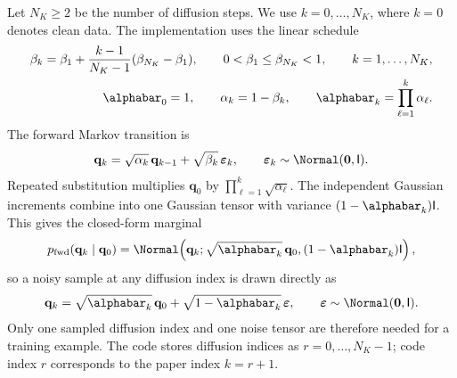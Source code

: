 Let $N_K\geq2$ be the number of diffusion steps. We use $k=0,\ldots,N_K$, where
$k=0$ denotes clean data. The implementation uses the linear schedule
\begin{equation}
  \begin{aligned}
    \beta_k
    =
    \beta_1+\frac{k-1}{N_K-1}(\beta_{N_K}-\beta_1),
    \qquad 0<\beta_1\leq\beta_{N_K}<1,
    \qquad k=1,\ldots,N_K,
    \\
    \alphabar_0=1,
    \qquad
    \alpha_k=1-\beta_k,
    \qquad
    \alphabar_k=\prod_{\ell=1}^{k}\alpha_\ell .
  \end{aligned}
    \label{eq:alpha_schedule}
\end{equation}
The forward Markov transition is
\begin{equation}
    \mathbf{q}_k
    =
    \sqrt{\alpha_k}\,\mathbf{q}_{k-1}
    +
    \sqrt{\beta_k}\,\boldsymbol{\varepsilon}_k,
    \qquad
    \boldsymbol{\varepsilon}_k\sim\Normal(\mathbf{0},\mathsf{I}).
    \label{eq:forward_step}
\end{equation}
Repeated substitution multiplies $\mathbf{q}_0$ by
$\prod_{\ell=1}^{k}\sqrt{\alpha_\ell}$. The independent Gaussian increments
combine into one Gaussian tensor with variance $(1-\alphabar_k)\mathsf{I}$.
This gives the closed-form marginal
\begin{equation}
    p_{\mathrm{fwd}}(\mathbf{q}_k\mid\mathbf{q}_0)
    =
    \Normal\!\left(
        \mathbf{q}_k;
        \sqrt{\alphabar_k}\,\mathbf{q}_0,
        (1-\alphabar_k)\mathsf{I}
    \right),
    \label{eq:forward_marginal_density}
\end{equation}
so a noisy sample at any diffusion index is drawn directly as
\begin{equation}
    \mathbf{q}_k
    =
    \sqrt{\alphabar_k}\,\mathbf{q}_0
    +
    \sqrt{1-\alphabar_k}\,\boldsymbol{\varepsilon},
    \qquad
    \boldsymbol{\varepsilon}\sim\Normal(\mathbf{0},\mathsf{I}).
    \label{eq:forward_marginal}
\end{equation}
Only one sampled diffusion index and one noise tensor are therefore needed for a
training example. The code stores diffusion indices as $r=0,\ldots,N_K-1$; code
index $r$ corresponds to the paper index $k=r+1$.

